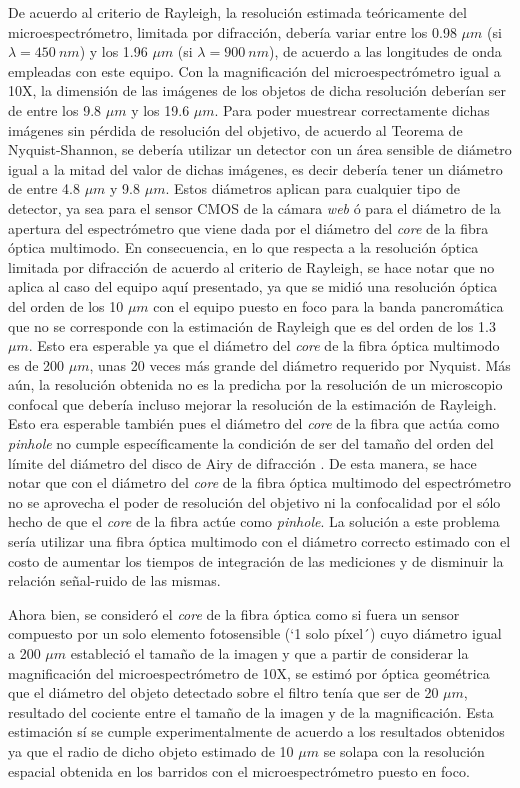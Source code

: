 De acuerdo al criterio de Rayleigh, la resolución estimada teóricamente del microespectrómetro, limitada por difracción, debería variar entre los 0.98 $\mu m$ (si $\lambda = 450 ~nm$) y los 1.96 $\mu m$ (si $\lambda = 900 ~nm$), de acuerdo a las longitudes de onda empleadas con este equipo. Con la magnificación del microespectrómetro igual a 10X, la dimensión de las imágenes de los objetos de dicha resolución deberían ser de entre los 9.8 $\mu m$ y los 19.6 $\mu m$. Para poder muestrear correctamente dichas imágenes sin pérdida de resolución del objetivo, de acuerdo al Teorema de Nyquist-Shannon, se debería utilizar un detector con un área sensible de diámetro igual a la mitad del valor de dichas imágenes, es decir debería tener un diámetro de entre 4.8 $\mu m$ y 9.8 $\mu m$. Estos diámetros aplican para cualquier tipo de detector, ya sea para el sensor CMOS de la cámara \textit{web} ó para el diámetro de la apertura del espectrómetro que viene dada por el diámetro del \textit{core} de la fibra óptica multimodo. En consecuencia, en lo que respecta a la resolución óptica limitada por difracción de acuerdo al criterio de Rayleigh, se hace notar que no aplica al caso del equipo aquí presentado, ya que se midió una resolución óptica del orden de los 10 $\mu m$ con el equipo puesto en foco para la banda pancromática que no se corresponde con la estimación de Rayleigh que es del orden de los 1.3 $\mu m$. Esto era esperable ya que el diámetro del \textit{core} de la fibra óptica multimodo es de 200 $\mu m$, unas 20 veces más grande del diámetro requerido por Nyquist. Más aún, la resolución obtenida no es la predicha por la resolución de un microscopio confocal que debería incluso mejorar la resolución de la estimación de Rayleigh. Esto era esperable también pues el diámetro del \textit{core} de la fibra que actúa como \textit{pinhole} no cumple específicamente la condición de ser del tamaño del orden del límite del diámetro del disco de Airy de difracción \cite{wilson}. De esta manera, se hace notar que con el diámetro del \textit{core} de la fibra óptica multimodo del espectrómetro no se aprovecha el poder de resolución del objetivo ni la confocalidad por el sólo hecho de que el \textit{core} de la fibra actúe como \textit{pinhole}. La solución a este problema sería utilizar una fibra óptica multimodo con el diámetro correcto estimado con el costo de aumentar los tiempos de integración de las mediciones y de disminuir la relación señal-ruido de las mismas.

Ahora bien, se consideró el \textit{core} de la fibra óptica como si fuera un sensor compuesto por un solo elemento fotosensible (`1 solo píxel´) cuyo diámetro igual a 200 $\mu m$ estableció el tamaño de la imagen y que a partir de considerar la magnificación del microespectrómetro de 10X, se estimó por óptica geométrica que el diámetro del objeto detectado sobre el filtro tenía que ser de 20 $\mu m$, resultado del cociente entre el tamaño de la imagen y de la magnificación. Esta estimación sí se cumple experimentalmente de acuerdo a los resultados obtenidos ya que el radio de dicho objeto estimado de 10 $\mu m$ se solapa con la resolución espacial obtenida en los barridos con el microespectrómetro puesto en foco.

